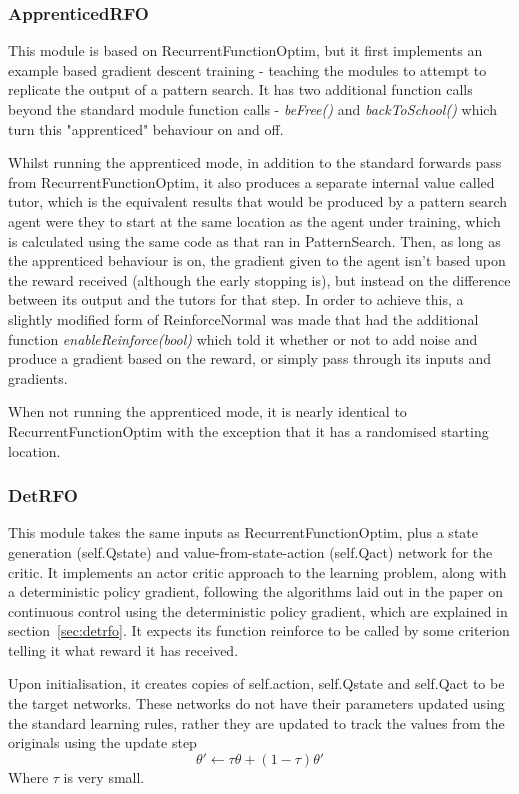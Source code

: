 \subsubsection{ApprenticedRFO}
This module is based on RecurrentFunctionOptim, but it first implements an example based gradient descent training - teaching the modules to attempt to replicate the output of a pattern search. It has two additional function calls beyond the standard module function calls - \emph{beFree()} and \emph{backToSchool()} which turn this "apprenticed" behaviour on and off.

Whilst running the apprenticed mode, in addition to the standard forwards pass from RecurrentFunctionOptim, it also produces a separate internal value called tutor, which is the equivalent results that would be produced by a pattern search agent were they to start at the same location as the agent under training, which is calculated using the same code as that ran in PatternSearch. Then, as long as the apprenticed behaviour is on, the gradient given to the agent isn't based upon the reward received (although the early stopping is), but instead on the difference between its output and the tutors for that step. In order to achieve this, a slightly modified form of ReinforceNormal was made that had the additional function \emph{enableReinforce(bool)} which told it whether or not to add noise and produce a gradient based on the reward, or simply pass through its inputs and gradients.

When not running the apprenticed mode, it is nearly identical to RecurrentFunctionOptim with the exception that it has a randomised starting location.

\subsubsection{DetRFO}
This module takes the same inputs as RecurrentFunctionOptim, plus a state generation (self.Qstate) and value-from-state-action (self.Qact) network for the critic. It implements an actor critic approach to the learning problem, along with a deterministic policy gradient, following the algorithms laid out in the paper on continuous control using the deterministic policy gradient\cite{lillicrap2015continuous}, which are explained in section~\ref{sec:detrfo}. It expects its function reinforce to be called by some criterion telling it what reward it has received.

Upon initialisation, it creates copies of self.action, self.Qstate and self.Qact to be the target networks. These networks do not have their parameters updated using the standard learning rules, rather they are updated to track the values from the originals using the update step \begin{equation}
\theta' \gets \tau \theta + (1 - \tau)\theta'
\end{equation} Where $\tau$ is very small.

